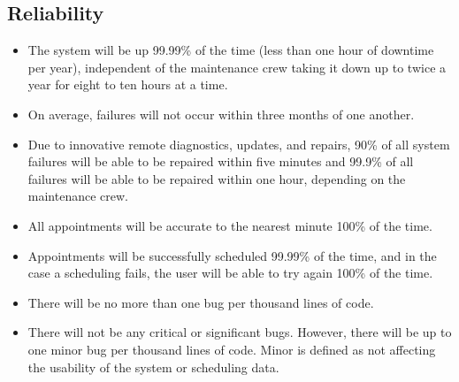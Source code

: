 \subsection{Reliability}
\begin{itemize}
\item The system will be up 99.99\% of the time (less than one hour of downtime per year), independent of the maintenance crew taking it down up to twice a year for eight to ten hours at a time.
\item On average, failures will not occur within three months of one another.
\item Due to innovative remote diagnostics, updates, and repairs, 90\% of all system failures will be able to be repaired within five minutes and 99.9\% of all failures will be able to be repaired within one hour, depending on the maintenance crew.
\item All appointments will be accurate to the nearest minute 100\% of the time.
\item Appointments will be successfully scheduled 99.99\% of the time, and in the case a scheduling fails, the user will be able to try again 100\% of the time.
\item There will be no more than one bug per thousand lines of code.
\item There will not be any critical or significant bugs. However, there will be up to one minor bug per thousand lines of code. Minor is defined as not affecting the usability of the system or scheduling data.
\end{itemize}
